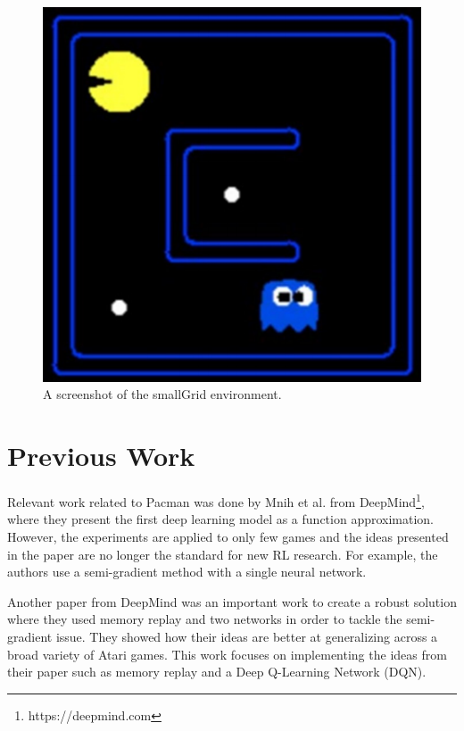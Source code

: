 \documentclass[conference]{IEEEtran}
\begin{document}
\begin{figure}[h]
    \centering
    \includegraphics[scale=1.0]{pacman_small}
    \caption{A screenshot of the smallGrid environment.}
    \label{fig:pacman-smallgrid}
\end{figure}


\section{Previous Work}
Relevant work related to Pacman was done by Mnih et al. \cite{MnihKSGAWR13} from DeepMind\footnote{https://deepmind.com}, where they present the first deep learning model as a function approximation. However, the experiments are applied to only few games and the ideas presented in the paper are no longer the standard for new RL research. For example, the authors use a semi-gradient method with a single neural network.

Another paper from DeepMind \cite{Mnih2015} was an important work to create a robust solution where they used memory replay and two networks in order to tackle the semi-gradient issue. They showed how their ideas are better at generalizing across a broad variety of Atari games. This work focuses on implementing the ideas from their paper such as memory replay and a Deep Q-Learning Network (DQN).
\end{document}
